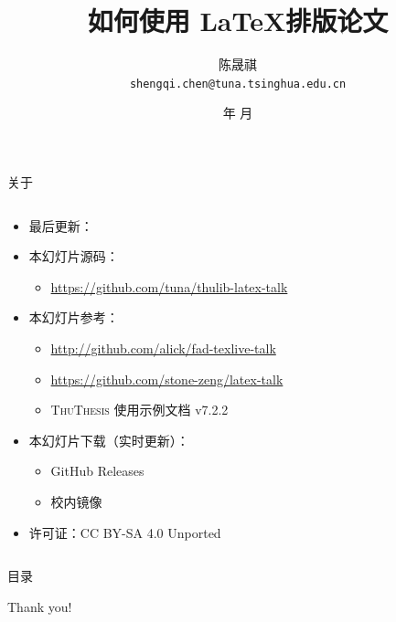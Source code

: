 \documentclass[xcolor=table,dvipsnames,svgnames,aspectratio=169,fontset=ubuntu]{ctexbeamer}
\title{如何使用 \LaTeX 排版论文}
\author[陈晟祺]{\vspace{1em} 陈晟祺\\ \texttt{shengqi.chen@tuna.tsinghua.edu.cn}}
\institute{清华大学 TUNA 协会}
\date[图书馆专题培训讲座]{\the\year 年 \the\month 月}
\newcommand{\ThuThesis}{\textsc{ThuThesis}\xspace}
\newcommand{\ThuThesisVersion}{7.2.2}
\newcommand\link[1]{\href{#1}{\faLink}}
\begin{document}
\begin{frame}
  \titlepage
\end{frame}


\begin{frame}{关于}
  \begin{columns}[c]
    \begin{column}{.7\textwidth}
      \begin{itemize}
        \item 最后更新：\texttt{\DTMnow}
        \item 本幻灯片源码：
          \begin{itemize}
            \item \url{https://github.com/tuna/thulib-latex-talk}
          \end{itemize}
        \item 本幻灯片参考：
          \begin{itemize}
            \item \url{http://github.com/alick/fad-texlive-talk}
            \item \url{https://github.com/stone-zeng/latex-talk}
            \item \ThuThesis{} 使用示例文档 v\ThuThesisVersion
          \end{itemize}
        \item 本幻灯片下载（实时更新）：
          \begin{itemize}
            \item GitHub Releases \link{https://github.com/tuna/thulib-latex-talk/releases}
            \item 校内镜像 \link{https://stu.cs.tsinghua.edu.cn/\~harry/latex-talk.pdf}
          \end{itemize}
        \item 许可证：CC BY-SA 4.0 Unported \ccbysa
      \end{itemize}
    \end{column}
    \begin{column}{.3\textwidth}
    \end{column}
  \end{columns}
\end{frame}


\begin{frame}{目录}
  \tableofcontents
\end{frame}







\begin{frame}
  \begin{center}
    {\Huge\calligra Thank you!}
  \end{center}
\end{frame}
\end{document}
